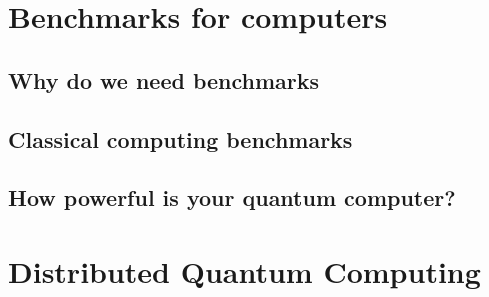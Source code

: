 \documentclass{book}
\begin{document}
\chapter{Benchmarks for computers}

\section{Why do we need benchmarks}

\section{Classical computing benchmarks}

\section{How powerful is your quantum computer?}

\chapter{Distributed Quantum Computing}
\end{document}
